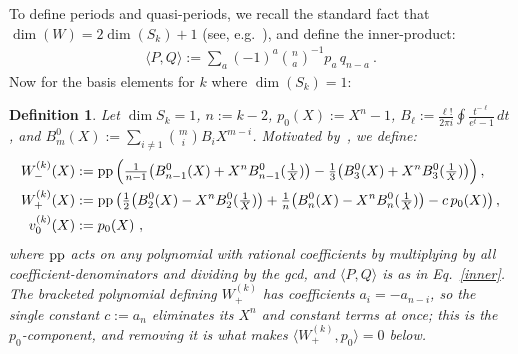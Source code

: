 \documentclass[11pt]{article}
\newtheorem{definition}[theorem]{Definition}
\begin{document}
To define periods and quasi-periods, we recall the standard fact
that $\dim(W)=2\dim(S_k)+1$ (see, e.g.~\cite{KZ1984}), and define 
the inner-product:
\begin{align}\label{inner}
\langle P,Q\rangle:=\sum_a(-1)^a\binom{n}{a}^{-1}p_a\,q_{n-a}~.
\end{align}
Now for the basis elements for $k$ where $\dim(S_k) = 1$:
\begin{definition}\label{def:Wpm}
Let $\dim S_k=1$, $n:=k-2$, $p_0(X):=X^n-1$, $B_\ell := \tfrac{\ell!}{2\pi i}\oint \tfrac{t^{-\ell}}{e^{t}-1}\,dt$, and
$B^0_m(X):=\sum_{i\ne1}\binom{m}{i}B_i X^{m-i}$. Motivated by~\cite[Thm.~1$'$]{KZ1984}, we define:
\begin{align}
W^{(k)}_-(X)&:={\rm pp}\left(\tfrac{1}{n-1}\big(B^0_{n-1}(X)+X^nB^0_{n-1}(\tfrac1X)\big)
-\tfrac13\big(B^0_3(X)+X^nB^0_3(\tfrac1X)\big)\right),\\
W^{(k)}_+(X)&:={\rm pp}\left(\tfrac12\big(B^0_2(X)-X^nB^0_2(\tfrac1X)\big)
+\tfrac1n\big(B^0_n(X)-X^nB^0_n(\tfrac1X)\big)-c\,p_0(X)\right),\\
v_0^{(k)}(X)&:= p_0(X)~,
\end{align}
where ${\rm pp}$ acts on any polynomial with rational coefficients by multiplying by all
coefficient-denominators and dividing by the gcd, and $\langle P, Q\rangle$ is as in
Eq.~\eqref{inner}. The bracketed polynomial defining $W^{(k)}_+$ has coefficients $a_i=-a_{n-i}$,
so the single constant $c:=a_n$ eliminates its $X^n$ and constant terms at once; this is the
$p_0$-component, and removing it is what makes $\langle W^{(k)}_+,p_0\rangle=0$ below.
\end{definition}
\end{document}
